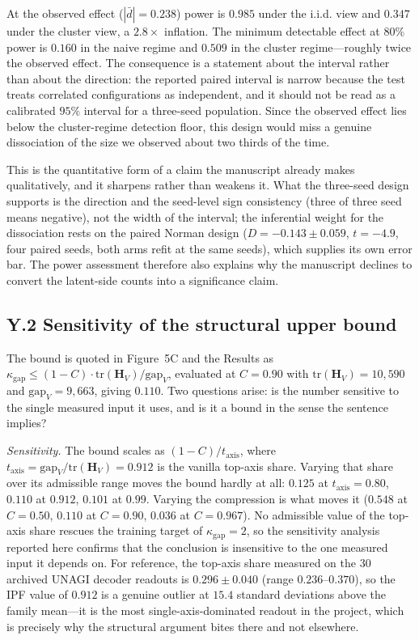 \documentclass[11 pt,a4 paper]{article}
\newcommand{\Hmat}{\mathbf{H}}\newcommand{\Wmat}{\mathbf{W}}\newcommand{\Jmat}{\mathbf{J}}
\begin{document}
At the observed effect ($|\bar d|=0.238$) power is $0.985$ under the i.i.d. view and $0.347$ under the cluster view, a $2.8\times$ inflation. The minimum detectable effect at $80\%$ power is $0.160$ in the naive regime and $0.509$ in the cluster regime---roughly twice the observed effect. The consequence is a statement about the interval rather than about the direction: the reported paired interval is narrow because the test treats correlated configurations as independent, and it should not be read as a calibrated $95\%$ interval for a three-seed population. Since the observed effect lies below the cluster-regime detection floor, this design would miss a genuine dissociation of the size we observed about two thirds of the time.

This is the quantitative form of a claim the manuscript already makes qualitatively, and it sharpens rather than weakens it. What the three-seed design supports is the direction and the seed-level sign consistency (three of three seed means negative), not the width of the interval; the inferential weight for the dissociation rests on the paired Norman design ($D=-0.143\pm0.059$, $t=-4.9$, four paired seeds, both arms refit at the same seeds), which supplies its own error bar. The power assessment therefore also explains why the manuscript declines to convert the latent-side counts into a significance claim.

\subsection*{Y.2 Sensitivity of the structural upper bound}

The bound is quoted in Figure~5C and the Results as $\kappa_{\mathrm{gap}}\leq(1-C)\cdot\mathrm{tr}(\Hmat_V)/\mathrm{gap}_V$, evaluated at $C=0.90$ with $\mathrm{tr}(\Hmat_V)=10{,}590$ and $\mathrm{gap}_V=9{,}663$, giving $0.110$. Two questions arise: is the number sensitive to the single measured input it uses, and is it a bound in the sense the sentence implies?

\emph{Sensitivity.} The bound scales as $(1-C)/t_{\mathrm{axis}}$, where $t_{\mathrm{axis}}=\mathrm{gap}_V/\mathrm{tr}(\Hmat_V)=0.912$ is the vanilla top-axis share. Varying that share over its admissible range moves the bound hardly at all: $0.125$ at $t_{\mathrm{axis}}=0.80$, $0.110$ at $0.912$, $0.101$ at $0.99$. Varying the compression is what moves it ($0.548$ at $C=0.50$, $0.110$ at $C=0.90$, $0.036$ at $C=0.967$). No admissible value of the top-axis share rescues the training target of $\kappa_{\mathrm{gap}}=2$, so the sensitivity analysis reported here confirms that the conclusion is insensitive to the one measured input it depends on. For reference, the top-axis share measured on the $30$ archived UNAGI decoder readouts is $0.296\pm0.040$ (range $0.236$--$0.370$), so the IPF value of $0.912$ is a genuine outlier at $15.4$ standard deviations above the family mean---it is the most single-axis-dominated readout in the project, which is precisely why the structural argument bites there and not elsewhere.
\end{document}
